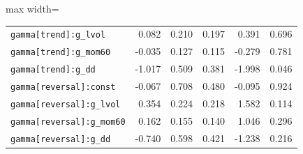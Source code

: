 \begin{table}[!htbp]
\begin{adjustbox}{max width=\textwidth}
\begin{tabular}{lrrrrr}
\texttt{gamma[trend]:g\_lvol} & 0.082 & 0.210 & 0.197 & 0.391 & 0.696\\
\texttt{gamma[trend]:g\_mom60} & -0.035 & 0.127 & 0.115 & -0.279 & 0.781\\
\texttt{gamma[trend]:g\_dd} & -1.017 & 0.509 & 0.381 & -1.998 & 0.046\\
\texttt{gamma[reversal]:const} & -0.067 & 0.708 & 0.480 & -0.095 & 0.924\\
\texttt{gamma[reversal]:g\_lvol} & 0.354 & 0.224 & 0.218 & 1.582 & 0.114\\
\texttt{gamma[reversal]:g\_mom60} & 0.162 & 0.155 & 0.140 & 1.046 & 0.296\\
\texttt{gamma[reversal]:g\_dd} & -0.740 & 0.598 & 0.421 & -1.238 & 0.216\\
\bottomrule
\end{tabular}
\end{adjustbox}
\end{table}